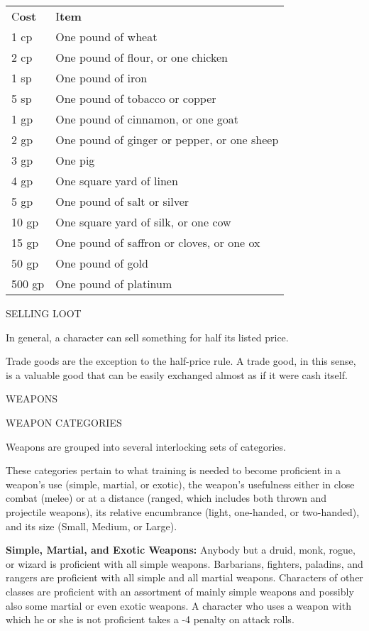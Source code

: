\documentclass{article}
\begin{document}
\vspace{12pt}
\begin{tabular}{|>{\raggedright}p{26pt}|>{\raggedright}p{177pt}|}
\hline
\multicolumn{2}{|p{204pt}|}{\section*{T\textbf{able: Trade Goods}}}\tabularnewline
\hline
C\textbf{ost} & I\textbf{tem}\tabularnewline
\hline
1 cp & One pound of wheat\tabularnewline
\hline
2 cp & One pound of flour, or one chicken\tabularnewline
\hline
1 sp & One pound of iron\tabularnewline
\hline
5 sp & One pound of tobacco or copper\tabularnewline
\hline
1 gp & One pound of cinnamon, or one goat\tabularnewline
\hline
2 gp & One pound of ginger or pepper, or one sheep\tabularnewline
\hline
3 gp & One pig\tabularnewline
\hline
4 gp & One square yard of linen\tabularnewline
\hline
5 gp & One pound of salt or silver\tabularnewline
\hline
10 gp & One square yard of silk, or one cow\tabularnewline
\hline
15 gp & One pound of saffron or cloves, or one ox\tabularnewline
\hline
50 gp & One pound of gold\tabularnewline
\hline
500 gp & One pound of platinum\tabularnewline
\hline
\end{tabular}

\vspace{12pt}
SELLING LOOT

In general, a character can sell something for half its listed price.

Trade goods are the exception to the half-price rule. A trade good, in this sense, 
is a valuable good that can be easily exchanged almost as if it were cash itself.

\vspace{12pt}
{\LARGE{}WEAPONS}

WEAPON CATEGORIES

Weapons are grouped into several interlocking sets of categories.

These categories pertain to what training is needed to become proficient in a weapon's 
use (simple, martial, or exotic), the weapon's usefulness either in close combat 
(melee) or at a distance (ranged, which includes both thrown and projectile weapons), 
its relative encumbrance (light, one-handed, or two-handed), and its size (Small, 
Medium, or Large).

\textbf{Simple, Martial, and Exotic Weapons:} Anybody but a druid, monk, rogue, 
or wizard is proficient with all simple weapons. Barbarians, fighters, paladins, 
and rangers are proficient with all simple and all martial weapons. Characters 
of other classes are proficient with an assortment of mainly simple weapons and 
possibly also some martial or even exotic weapons. A character who uses a weapon 
with which he or she is not proficient takes a -4 penalty on attack rolls.
\end{document}
